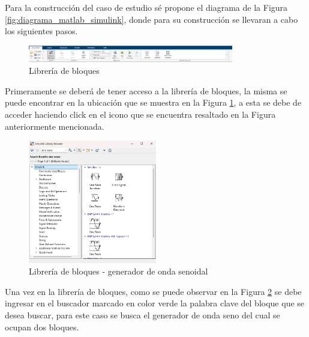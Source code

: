 Para la construcción del caso de estudio sé propone el diagrama de la Figura \ref{fig:diagrama_matlab_simulink}, donde para su construcción se llevaran a cabo los siguientes pasos.

\begin{figure}[h!]
    \centering
    \includegraphics[width=0.8\textwidth]{fig/especifico_2/CASO_ESTUDIO_FILTRO/libbroswer_0.png}
    \caption{Librería de bloques}
    \label{fig:lib_bloq}
\end{figure}

Primeramente se deberá de tener acceso a la librería de bloques, la misma se puede encontrar en la ubicación que se muestra en la Figura \ref{fig:lib_bloq}, a esta se debe de acceder haciendo click en el icono que se encuentra resaltado en la Figura anteriormente mencionada.
\newpage


\begin{figure}[h!]
    \centering
    \includegraphics[width=0.5\textwidth]{fig/especifico_2/CASO_ESTUDIO_FILTRO/sinewave_0.png}
    \caption{Librería de bloques - generador de onda senoidal}
    \label{fig:lib_bloq_sine}
\end{figure}

Una vez en la librería de bloques, como se puede observar en la Figura \ref{fig:lib_bloq_sine} se debe ingresar en el buscador marcado en color verde la palabra clave del bloque que se desea buscar, para este caso se busca el generador de onda seno del cual se ocupan dos bloques. 


